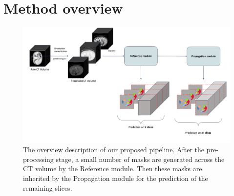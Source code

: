 \section{Method overview}
\label{sec:method_overview}


\begin{figure}[!htb]
    \centering
    \includegraphics[width=\textwidth]{content/resources/new_images/overview.pdf}
    \caption{The overview description of our proposed pipeline. After the pre-processing stage, a small number of masks are generated across the CT volume by the Reference module. Then these masks are inherited by the Propagation module for the prediction of the remaining slices.}
    \label{fig:method_overview}
\end{figure}

